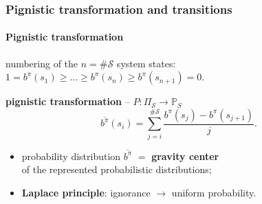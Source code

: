 \documentclass[12pt,svgnames,table]{beamer}
\begin{document}
{\begin{frame}
\frametitle{Pignistic transformation and transitions}
\framesubtitle{\footnotesize Pignistic transformation}
numbering of the $n = \# \mathcal{S}$ system states:
$1 = b^{\pi}(s_1) \geqslant \ldots \geqslant b^{\pi}(s_{n}) \geqslant b^{\pi}(s_{n+1}) = 0$.
\begin{exampleblock}{\textbf{pignistic transformation} -- $P: \Pi_{\mathcal{S}} \rightarrow \mathbb{P}_{S} $}
\[ \overline{b^{\pi}}(s_i) = \sum_{j=i}^{\# \mathcal{S}} \frac{b^{\pi}(s_j) - b^{\pi}(s_{j+1})}{j}.\]
\end{exampleblock}
\begin{itemize}
\item probability distribution $\overline{b^{\pi}}$ $=$ \textbf{gravity center} \\ 
\hspace{1cm} of the represented probabilistic distributions;
\item \textbf{Laplace principle}: ignorance $\rightarrow$ uniform probability.
\end{itemize}
\end{frame}

}
\end{document}
